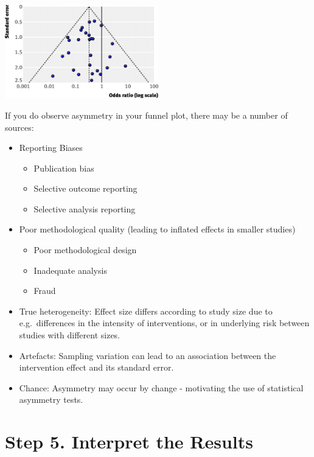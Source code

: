 \documentclass[
]{book}
\providecommand{\tightlist}{%
  \setlength{\itemsep}{0pt}\setlength{\parskip}{0pt}}
\begin{document}
\includegraphics[width=0.5\textwidth,height=\textheight]{figs/funnelplot.jpg}

If you do observe asymmetry in your funnel plot, there may be a number of sources:

\begin{itemize}
\item
  Reporting Biases

  \begin{itemize}
  \tightlist
  \item
    Publication bias
  \item
    Selective outcome reporting
  \item
    Selective analysis reporting
  \end{itemize}
\item
  Poor methodological quality (leading to inflated effects in smaller studies)

  \begin{itemize}
  \tightlist
  \item
    Poor methodological design
  \item
    Inadequate analysis
  \item
    Fraud
  \end{itemize}
\item
  True heterogeneity: Effect size differs according to study size due to e.g.~differences in the intensity of interventions, or in underlying risk between studies with different sizes.
\item
  Artefacts: Sampling variation can lead to an association between the intervention effect and its standard error.
\item
  Chance: Asymmetry may occur by change - motivating the use of statistical asymmetry tests.
\end{itemize}

\hypertarget{step-5.-interpret-the-results}{%
\section{Step 5. Interpret the Results}\label{step-5.-interpret-the-results}}
\end{document}
